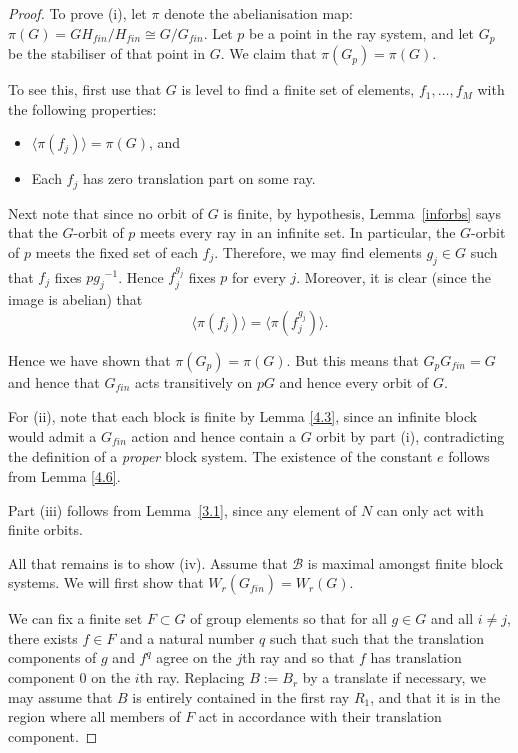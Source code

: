 \documentclass[11pt,a4paper]{amsart}
\theoremstyle{definition}
\theoremstyle{remark}
\newcommand{\gfin}{G_{\textit{fin}}}
\newcommand{\hfin}{H_{\textit{fin}}}
\begin{document}
\begin{proof}
	To prove (i), let $\pi$ denote the abelianisation map: $\pi(G)= G \hfin/\hfin \cong G /\gfin$. Let $p$ be a point in the ray system, and let $G_p$ be the stabiliser of that point in $G$. We claim that $\pi(G_p) = \pi(G)$. 
	
	To see this, first use that $G$ is level to find a finite set of elements, $f_1, \ldots, f_M$ with the following properties: 
	\begin{itemize}
		\item $\langle \pi(f_j) \rangle = \pi(G)$, and 
		\item Each $f_j$ has zero translation part on some ray. 
	\end{itemize}
	
	Next note that since no orbit of $G$ is finite, by hypothesis, Lemma~\ref{inforbs} says that the $G$-orbit of $p$ meets every ray in an infinite set. In particular, the $G$-orbit of $p$ meets the fixed set of each $f_j$. Therefore, we may find elements $g_j \in G$ such that $f_j$ fixes $p {g_j}^{-1}$. Hence $f_j^{{g_j}}$ fixes $p$ for every $j$. Moreover, it is clear (since the image is abelian) that
	$$
	\langle \pi(f_j) \rangle = \langle \pi(f_j^{{g_j}}) \rangle. 
	$$  
	
	Hence we have shown that $\pi(G_p) = \pi(G)$. But this means that $G_p \gfin = G$ and hence that $\gfin$ acts transitively on $pG$ and hence every orbit of $G$. 
	
	For (ii), note that each block is finite by Lemma \ref{4.3}, since an infinite block would admit a $\gfin$ action and hence contain a $G$ orbit by part (i), contradicting the definition of a \textit{proper} block system. The existence of the constant $e$ follows from Lemma \ref{4.6}.
	
	Part (iii) follows from Lemma~\ref{3.1}, since any element of $N$ can only act with finite orbits.
	
	
	All that remains is to show (iv). Assume that $\mathcal{B}$ is maximal amongst finite block systems. We will first show that $W_r(\gfin) = W_r(G)$.
	
	We can fix a finite set $F\subset G$ of group elements so that for all $g\in G$ and all $i\ne j$, there exists $f\in F$ and a natural number $q$ such that such that the translation components of $g$ and $f^q$ agree on the $j$th ray and so that $f$ has translation component $0$ on the $i$th ray.
	Replacing $B:=B_r$ by a translate if necessary, we may assume that $B$ is entirely contained in the first ray $R_1$, and that it is in the region where all members of $F$ act in accordance with their translation component.
	

\end{proof}
\end{document}
